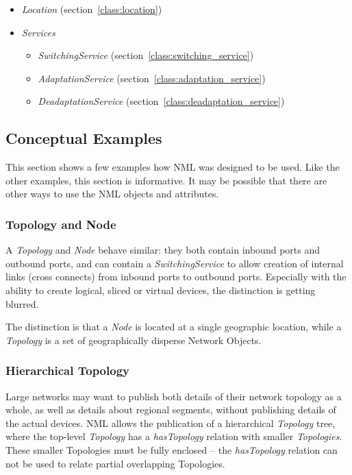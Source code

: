 \begin{itemize}
    \item \emph{Location} (section~\ref{class:location})
      
    \item \emph{Services}
      \begin{itemize}
        \item \emph{SwitchingService} (section~\ref{class:switching_service})
          
        \item \emph{AdaptationService} (section~\ref{class:adaptation_service})
          
        \item \emph{DeadaptationService} (section~\ref{class:deadaptation_service})
          
      \end{itemize}

\end{itemize}

\subsection{Conceptual Examples}

This section shows a few examples how NML was designed to be used. Like the other examples, this section is informative.  It may be possible that there are other ways to use the NML objects and attributes.

\subsubsection{Topology and Node}

A \emph{Topology} and \emph{Node} behave similar: they both contain inbound ports and outbound ports, and can contain a \emph{SwitchingService} to allow creation of internal links (cross connects) from inbound ports to outbound ports. Especially with the ability to create logical, sliced or virtual devices, the distinction is getting blurred.

The distinction is that a \emph{Node} is located at a single geographic location, while a \emph{Topology} is a set of geographically disperse Network Objects.

\subsubsection{Hierarchical Topology}

Large networks may want to publish both details of their network topology as a whole, as well as details about regional segments, without publishing details of the actual devices. NML allows the publication of a hierarchical \emph{Topology} tree, where the top-level \emph{Topology} has a \emph{hasTopology} relation with smaller \emph{Topologies}. These smaller Topologies must be fully enclosed -- the \emph{hasTopology} relation can not be used to relate partial overlapping Topologies.

